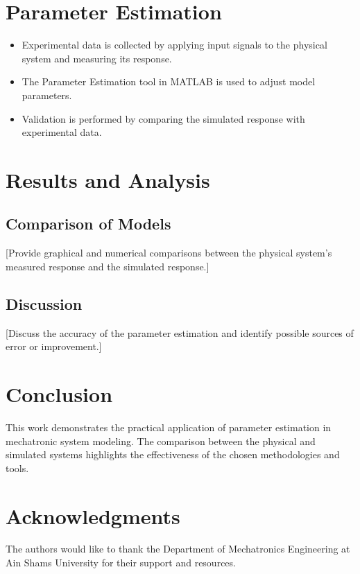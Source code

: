 \documentclass[conference]{IEEEtran}
\begin{document}
\section{Parameter Estimation}
\begin{itemize}
    \item Experimental data is collected by applying input signals to the physical system and measuring its response.
    \item The Parameter Estimation tool in MATLAB is used to adjust model parameters.
    \item Validation is performed by comparing the simulated response with experimental data.
\end{itemize}

\section{Results and Analysis}
\subsection{Comparison of Models}
[Provide graphical and numerical comparisons between the physical system's measured response and the simulated response.]

\subsection{Discussion}
[Discuss the accuracy of the parameter estimation and identify possible sources of error or improvement.]

\section{Conclusion}
This work demonstrates the practical application of parameter estimation in mechatronic system modeling. The comparison between the physical and simulated systems highlights the effectiveness of the chosen methodologies and tools.

\section*{Acknowledgments}
The authors would like to thank the Department of Mechatronics Engineering at Ain Shams University for their support and resources.


\cite{example_reference} %
\end{document}

